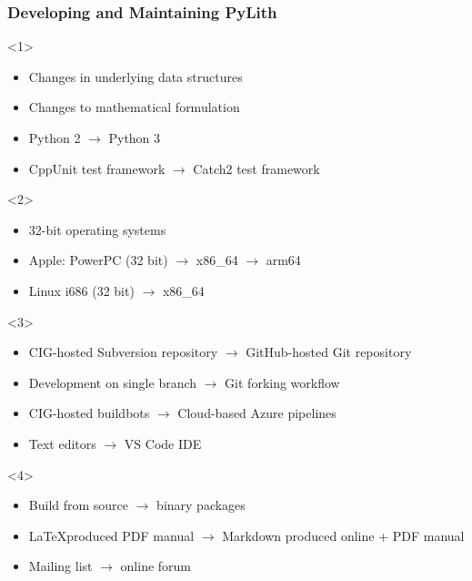 \documentclass[aspectratio=169]{beamer}
\begin{document}
\begin{frame}
  \frametitle{Developing and Maintaining PyLith}
  
  \begin{itemize}
    \begin{onlyenv}<1>
      \begin{itemize}
      \item Changes in underlying data structures
      \item Changes to mathematical formulation
      \item Python 2 $\rightarrow$ Python 3
      \item CppUnit test framework $\rightarrow$ Catch2 test framework
      \end{itemize}
    \end{onlyenv}
    \begin{onlyenv}<2>    
      \begin{itemize}
      \item 32-bit operating systems
      \item Apple: PowerPC (32 bit) $\rightarrow$ x86\_64 $\rightarrow$ arm64
      \item Linux i686 (32 bit) $\rightarrow$ x86\_64
      \end{itemize}
    \end{onlyenv}    
    \begin{onlyenv}<3>
      \begin{itemize}
      \item CIG-hosted Subversion repository $\rightarrow$ GitHub-hosted Git repository
      \item Development on single branch $\rightarrow$ Git forking workflow
      \item CIG-hosted buildbots $\rightarrow$ Cloud-based Azure pipelines
      \item Text editors $\rightarrow$ VS Code IDE
      \end{itemize}
    \end{onlyenv}
    \begin{onlyenv}<4>
      \begin{itemize}
      \item Build from source $\rightarrow$ binary packages
      \item \LaTeX produced PDF manual $\rightarrow$ Markdown produced online + PDF manual
      \item Mailing list $\rightarrow$ online forum
      \end{itemize}
    \end{onlyenv}
  \end{itemize}

\end{frame}
\end{document}
